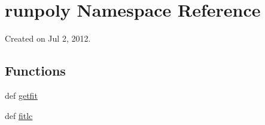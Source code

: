 \hypertarget{namespacerunpoly}{
\section{runpoly Namespace Reference}
\label{namespacerunpoly}
}


Created on Jul 2, 2012.  


\subsection*{Functions}
\begin{DoxyCompactItemize}
\item 
def \hyperlink{namespacerunpoly_aa4866b028ef0d94a7b9f237490073b28}{getfit}
\item 
def \hyperlink{namespacerunpoly_a19c006c67315b888598650bbd005e703}{fitlc}
\end{DoxyCompactItemize}
